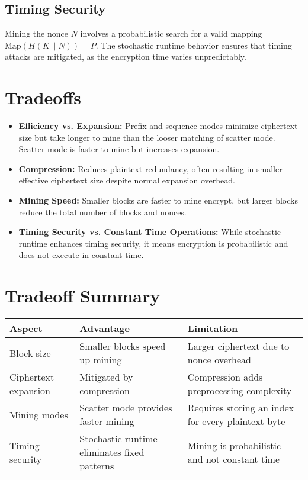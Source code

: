 \documentclass[11pt,a4paper]{article}
\begin{document}
\subsection*{Timing Security}
Mining the nonce \( N \) involves a probabilistic search for a valid mapping \( \text{Map}(H(K \parallel N)) = P \). The stochastic runtime behavior ensures that timing attacks are mitigated, as the encryption time varies unpredictably.

\section*{Tradeoffs}
\begin{itemize}
  \item \textbf{Efficiency vs. Expansion:} Prefix and sequence modes minimize ciphertext size but take longer to mine than the looser matching of scatter mode. Scatter mode is faster to mine but increases expansion.
  \item \textbf{Compression:} Reduces plaintext redundancy, often resulting in smaller effective ciphertext size despite normal expansion overhead.
  \item \textbf{Mining Speed:} Smaller blocks are faster to mine encrypt, but larger blocks reduce the total number of blocks and nonces.
  \item \textbf{Timing Security vs. Constant Time Operations:} While stochastic runtime enhances timing security, it means encryption is probabilistic and does not execute in constant time.
\end{itemize}

\section*{Tradeoff Summary}

\begin{center}
\small
\begin{tabular}{@{}p{2in}p{1.8in}p{2.4in}@{}}
\toprule
\textbf{Aspect}          & \textbf{Advantage}                                 & \textbf{Limitation}                          \\ \midrule
Block size               & Smaller blocks speed up mining                     & Larger ciphertext due to nonce overhead      \\
Ciphertext expansion     & Mitigated by compression                           & Compression adds preprocessing complexity    \\
Mining modes             & Scatter mode provides faster mining               & Requires storing an index for every plaintext byte \\
Timing security          & Stochastic runtime eliminates fixed patterns       & Mining is probabilistic and not constant time \\
\bottomrule
\end{tabular}
\end{center}
\end{document}
